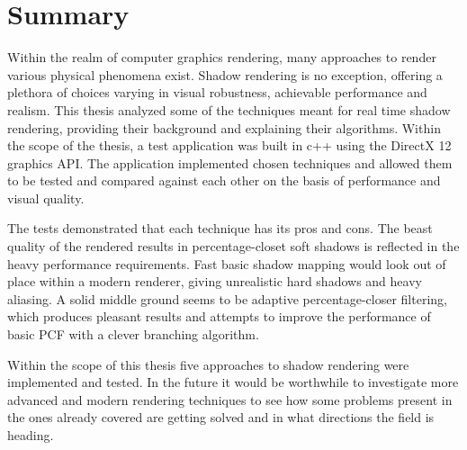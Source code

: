 \chapter{Summary}
\label{section:chapter_5}



Within the realm of computer graphics rendering, many approaches to render various physical phenomena exist. Shadow rendering is no exception, offering a plethora of choices varying in visual robustness, achievable performance and realism. This thesis analyzed some of the techniques meant for real time shadow rendering, providing their background and explaining their algorithms. Within the scope of the thesis, a test application was built in c++ using the DirectX 12 graphics API. The application implemented chosen techniques and allowed them to be tested and compared against each other on the basis of performance and visual quality.

The tests demonstrated that each technique has its pros and cons. The beast  quality of the rendered results in percentage-closet soft shadows is reflected in the heavy performance requirements. Fast basic shadow mapping would look out of place within a modern renderer, giving unrealistic hard shadows and heavy aliasing. A solid middle ground seems to be adaptive percentage-closer filtering, which produces pleasant results and attempts to improve the performance of basic PCF with a clever branching algorithm.

Within the scope of this thesis five approaches to shadow rendering were implemented and tested. In the future it would be worthwhile to investigate more advanced and modern rendering techniques to see how some problems present in the ones already covered are getting solved and in what directions the field is heading.